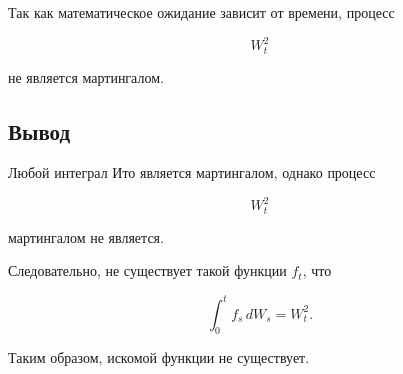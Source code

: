 Так как математическое ожидание зависит от времени, процесс

\[
W_t^2
\]

не является мартингалом.

\subsection*{Вывод}

Любой интеграл Ито является мартингалом, однако процесс

\[
W_t^2
\]

мартингалом не является.

Следовательно, не существует такой функции \(f_t\), что

\[
\int_0^t f_s\, dW_s = W_t^2.
\]

Таким образом, искомой функции не существует.
